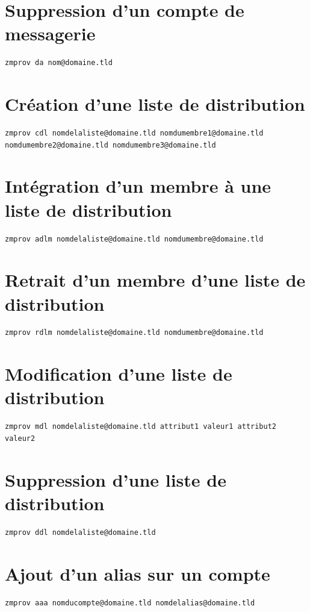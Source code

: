 \documentclass[11pt,a4paper]{report}
\begin{document}
\section{Suppression d'un compte de messagerie}
\begin{lstlisting}
zmprov da nom@domaine.tld
\end{lstlisting}


\section{Création d'une liste de distribution}
\begin{lstlisting}
zmprov cdl nomdelaliste@domaine.tld nomdumembre1@domaine.tld nomdumembre2@domaine.tld nomdumembre3@domaine.tld
\end{lstlisting}


\section{Intégration d'un membre à une liste de distribution}
\begin{lstlisting}
zmprov adlm nomdelaliste@domaine.tld nomdumembre@domaine.tld
\end{lstlisting}


\section{Retrait d'un membre d'une liste de distribution}
\begin{lstlisting}
zmprov rdlm nomdelaliste@domaine.tld nomdumembre@domaine.tld
\end{lstlisting}


\section{Modification d'une liste de distribution}
\begin{lstlisting}
zmprov mdl nomdelaliste@domaine.tld attribut1 valeur1 attribut2 valeur2
\end{lstlisting}


\section{Suppression d'une liste de distribution}
\begin{lstlisting}
zmprov ddl nomdelaliste@domaine.tld
\end{lstlisting}


\section{Ajout d'un alias sur un compte}
\begin{lstlisting}
zmprov aaa nomducompte@domaine.tld nomdelalias@domaine.tld
\end{lstlisting}
\end{document}
